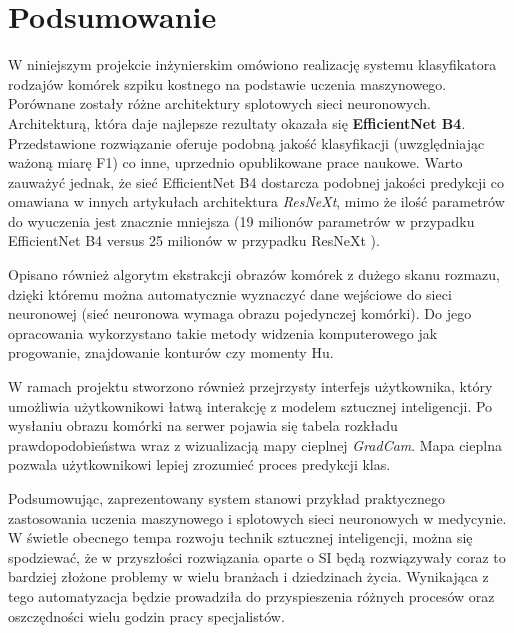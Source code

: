 \chapter{Podsumowanie}

W niniejszym projekcie inżynierskim omówiono realizację systemu klasyfikatora rodzajów komórek szpiku kostnego na podstawie uczenia maszynowego.
Porównane zostały różne architektury splotowych sieci neuronowych.
Architekturą, która daje najlepsze rezultaty okazała się \textbf{EfficientNet B4}.
Przedstawione rozwiązanie oferuje podobną jakość klasyfikacji (uwzględniając ważoną miarę F1) co inne, uprzednio opublikowane prace naukowe.
Warto zauważyć jednak, że sieć EfficientNet B4 dostarcza podobnej jakości predykcji co omawiana w innych artykułach architektura \textit{ResNeXt}, mimo że ilość parametrów do wyuczenia jest znacznie mniejsza (19 milionów parametrów w przypadku EfficientNet B4 versus 25 milionów w przypadku ResNeXt \cite{resnext}).

Opisano również algorytm ekstrakcji obrazów komórek z dużego skanu rozmazu, dzięki któremu można automatycznie wyznaczyć dane wejściowe do sieci neuronowej (sieć neuronowa wymaga obrazu pojedynczej komórki).
Do jego opracowania wykorzystano takie metody widzenia komputerowego jak progowanie, znajdowanie konturów czy momenty Hu.

W ramach projektu stworzono również przejrzysty interfejs użytkownika, który umożliwia użytkownikowi łatwą interakcję z modelem sztucznej inteligencji.
Po wysłaniu obrazu komórki na serwer pojawia się tabela rozkładu prawdopodobieństwa wraz z wizualizacją mapy cieplnej \textit{GradCam}.
Mapa cieplna pozwala użytkownikowi lepiej zrozumieć proces predykcji klas.

Podsumowując, zaprezentowany system stanowi przykład praktycznego zastosowania uczenia maszynowego i splotowych sieci neuronowych w medycynie.
W świetle obecnego tempa rozwoju technik sztucznej inteligencji, można się spodziewać, że w przyszłości rozwiązania oparte o SI będą rozwiązywały coraz to bardziej złożone problemy w wielu branżach i dziedzinach życia.
Wynikająca z tego automatyzacja będzie prowadziła do przyspieszenia różnych procesów oraz oszczędności wielu godzin pracy specjalistów.